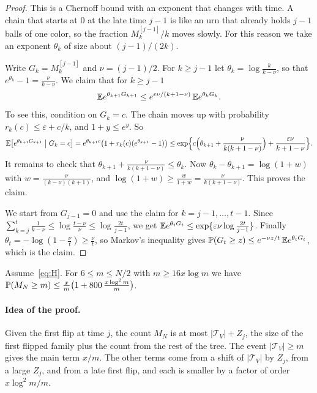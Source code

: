 \begin{proof}
This is a Chernoff bound with an exponent that changes with time. A chain
that starts at $0$ at the late time $j-1$ is like an urn that already holds
$j-1$ balls of one color, so the fraction $M^{[j-1]}_k/k$ moves slowly. For
this reason we take an exponent $\theta_k$ of size about $(j-1)/(2k)$.

Write $G_k=M^{[j-1]}_k$ and $\nu=(j-1)/2$. For $k\ge j-1$ let
$\theta_k=\log\frac k{k-\nu}$, so that $e^{\theta_k}-1=\frac\nu{k-\nu}$. We
claim that for $k\ge j-1$
\[
 \mathbb{E} e^{\theta_{k+1}G_{k+1}}\le e^{\varepsilon\nu/(k+1-\nu)}\,\mathbb{E} e^{\theta_kG_k}.
\]
To see this, condition on $G_k=c$. The chain moves up with probability
$r_k(c)\le\varepsilon+c/k$, and $1+y\le e^y$. So
\[
 \mathbb{E}\bigl[e^{\theta_{k+1}G_{k+1}}\bigm| G_k=c\bigr]
 =e^{\theta_{k+1}c}\bigl(1+r_k(c)(e^{\theta_{k+1}}-1)\bigr)
 \le\exp\Bigl\{c\Bigl(\theta_{k+1}+\frac{\nu}{k(k+1-\nu)}\Bigr)+\frac{\varepsilon\nu}{k+1-\nu}\Bigr\}.
\]
It remains to check that $\theta_{k+1}+\frac{\nu}{k(k+1-\nu)}\le\theta_k$.
Now $\theta_k-\theta_{k+1}=\log(1+w)$ with $w=\frac\nu{(k-\nu)(k+1)}$, and
$\log(1+w)\ge\frac w{1+w}=\frac\nu{k(k+1-\nu)}$. This proves the claim.

We start from $G_{j-1}=0$ and use the claim for $k=j-1,\dots,t-1$. Since
$\sum_{k=j}^t\frac1{k-\nu}\le\log\frac{t-\nu}\nu\le\log\frac{2t}{j-1}$, we
get $\mathbb{E} e^{\theta_tG_t}\le\exp\{\varepsilon\nu\log\frac{2t}{j-1}\}$. Finally
$\theta_t=-\log(1-\frac\nu t)\ge\frac\nu t$, so Markov's inequality gives
$\mathbb{P}(G_t\ge z)\le e^{-\nu z/t}\,\mathbb{E} e^{\theta_tG_t}$, which is the claim.
\end{proof}

\begin{proposition}\label{thm:B-cum-upper}
Assume~\eqref{eq:H}. For $6\le m\le N/2$ with
$m\ge16x\log m$ we have $\mathbb{P}(M_N\ge m)\le\frac
xm\bigl(1+800\,\frac{x\log^2m}m\bigr)$.
\end{proposition}

\paragraph{Idea of the proof.}
Given the first flip at time $j$, the count $M_N$ is at most $\lvert\mathcal T_V\rvert+Z_j$, the
size of the first flipped family plus the count from the rest of the tree.
The event $\lvert\mathcal T_V\rvert\ge m$ gives the main term $x/m$. The other terms come from a
shift of $\lvert\mathcal T_V\rvert$ by $Z_j$, from a large $Z_j$, and from a late first flip, and
each is smaller by a factor of order $x\log^2m/m$.

